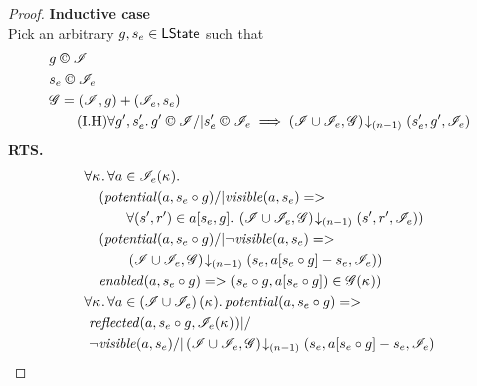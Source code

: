 \begin{lemma}
\begin{proof}
\noindent\textbf{Inductive case }\\
Pick an arbitrary $g, s_e \in \textsf{LState}$ such that
%
\begin{align}
	& g \confines \lmod \label{LEC:Ass1}\\
	& s_e \confines \lmod_e \label{LEC:Ass2}\\
	& \gmod = (\lmod, g) + (\lmod_{e}, s_e) \label{LEC:Ass3}\\
	& \tag{I.H} \for{g', s_e'}  g' \confines \lmod /| s'_e \confines \lmod_e \implies \extendsAMUpto{\lmod \cup \lmod_{e}, \gmod}{(n-1)}{s_e'}{g'}{\lmod_{e}} \label{LEC:IH}
\end{align}
%
\textbf{RTS.}
%
\begin{align}
	& 
	\V{\ca{}}  \V{a\in \lmod_e(\ca{})} \nonumber \\
  &\quad (\m{potential}(a, s_e \composeL g) /| \m{visible}(a, s_e) => \nonumber\\
  & \quad\qquad\for{(s', r') \in a[s_e, g]} \extendsAMUpto{\lmod \cup \lmod_e, \gmod}{(n-1)}{s'}{r'}{\lmod_e}) \label{LEC:Goal0}\\
% 
	&\quad (\m{potential}(a, s_e \composeL g) /| \neg\m{visible}(a, s_e) => \nonumber\\
  & \quad\qquad \extendsAMUpto{\lmod \cup \lmod_e, \gmod}{(n-1)}{s_e}{a[s_e \composeL g] - s_e}{\lmod_e}) \label{LEC:Goal1}\\
%   
  &\quad \m{enabled}(a,s_e \composeL g)
  => (s_e \composeL g, a[s_e \composeL g])\in \gmod(\ca{})) \label{LEC:Goal2}\\
%  
  &\V{\ca{}}\V{a\in \left(\lmod \cup \lmod_e \right) (\ca{})}
  \m{potential}(a,s_e \composeL g) =>\null \nonumber \\
  &\ \m{reflected}(a, s_e \composeL g,\lmod_e(\ca{})) |/\null \nonumber \\
%  
  &\ \neg\m{visible}(a, s_e) /| \extendsAMUpto{\lmod \cup \lmod_e, \gmod}{(n-1)}{s_e}{a[s_e \composeL g] - s_e}{\lmod_e}  \label{LEC:Goal3}
\end{align}
%
%


\end{proof}
\end{lemma}
